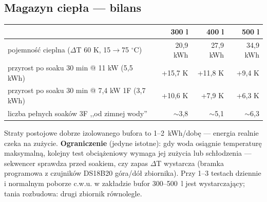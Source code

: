 \documentclass[11pt,a4paper]{article}
\begin{document}
\subsection{Magazyn ciepła --- bilans}
\begin{longtable}{@{}p{}rrr@{}}
\toprule
 & \textbf{300 l} & \textbf{400 l} & \textbf{500 l}\\
\midrule
pojemność cieplna ($\Delta$T 60 K, 15$\to$75 $^\circ$C) & 20,9 kWh & 27,9 kWh & 34,9 kWh\\
przyrost po soaku 30 min @ 11 kW (5,5 kWh) & +15,7 K & +11,8 K & +9,4 K\\
przyrost po soaku 30 min @ 7,4 kW 1F (3,7 kWh) & +10,6 K & +7,9 K & +6,3 K\\
liczba pełnych soaków 3F ,,od zimnej wody'' & $\sim$3,8 & $\sim$5,1 & $\sim$6,3\\
\bottomrule
\end{longtable}
Straty postojowe dobrze izolowanego bufora to 1--2~kWh/dobę --- energia realnie czeka na zużycie.
\textbf{Ograniczenie} (jedyne istotne): gdy woda osiągnie temperaturę maksymalną, kolejny test
obciążeniowy wymaga jej zużycia lub schłodzenia --- sekwencer sprawdza przed soakiem, czy zapas
$\Delta$T wystarcza (bramka programowa z czujników DS18B20 góra/dół zbiornika). Przy 1--3 testach
dziennie i normalnym poborze c.w.u. w zakładzie bufor 300--500~l jest wystarczający; tania
rozbudowa: drugi zbiornik równolegle.
\end{document}
